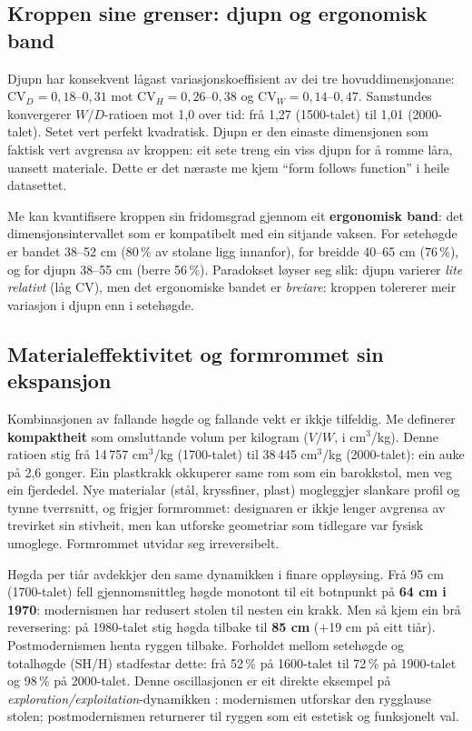 \documentclass[10pt, a4paper, twocolumn]{article}
\begin{document}
\subsection{Kroppen sine grenser: djupn og ergonomisk band}

Djupn har konsekvent lågast variasjonskoeffisient av dei tre hovuddimensjonane: $\text{CV}_D = 0{,}18$--$0{,}31$ mot $\text{CV}_H = 0{,}26$--$0{,}38$ og $\text{CV}_W = 0{,}14$--$0{,}47$. Samstundes konvergerer $W/D$-ratioen mot 1,0 over tid: frå 1,27 (1500-talet) til 1,01 (2000-talet). Setet vert perfekt kvadratisk. Djupn er den einaste dimensjonen som faktisk vert avgrensa av kroppen: eit sete treng ein viss djupn for å romme låra, uansett materiale. Dette er det næraste me kjem ``form follows function'' i heile datasettet.

Me kan kvantifisere kroppen sin fridomsgrad gjennom eit \textbf{ergonomisk band}: det dimensjonsintervallet som er kompatibelt med ein sitjande vaksen. For setehøgde er bandet 38--52 cm (80\,\% av stolane ligg innanfor), for breidde 40--65 cm (76\,\%), og for djupn 38--55 cm (berre 56\,\%). Paradokset løyser seg slik: djupn varierer \emph{lite relativt} (låg CV), men det ergonomiske bandet er \emph{breiare}: kroppen tolererer meir variasjon i djupn enn i setehøgde.

\subsection{Materialeffektivitet og formrommet sin ekspansjon}

Kombinasjonen av fallande høgde og fallande vekt er ikkje tilfeldig. Me definerer \textbf{kompaktheit} som omsluttande volum per kilogram ($V/W$, i cm$^3$/kg). Denne ratioen stig frå 14\,757 cm$^3$/kg (1700-talet) til 38\,445 cm$^3$/kg (2000-talet): ein auke på 2,6 gonger. Ein plastkrakk okkuperer same rom som ein barokkstol, men veg ein fjerdedel. Nye materialar (stål, kryssfiner, plast) mogleggjer slankare profil og tynne tverrsnitt, og frigjer formrommet: designaren er ikkje lenger avgrensa av trevirket sin stivheit, men kan utforske geometriar som tidlegare var fysisk umoglege. Formrommet utvidar seg irreversibelt.

Høgda per tiår avdekkjer den same dynamikken i finare oppløysing. Frå 95 cm (1700-talet) fell gjennomsnittleg høgde monotont til eit botnpunkt på \textbf{64 cm i 1970}: modernismen har redusert stolen til nesten ein krakk. Men så kjem ein brå reversering: på 1980-talet stig høgda tilbake til \textbf{85 cm} (+19 cm på eitt tiår). Postmodernismen henta ryggen tilbake. Forholdet mellom setehøgde og totalhøgde (SH/H) stadfestar dette: frå 52\,\% på 1600-talet til 72\,\% på 1900-talet og 98\,\% på 2000-talet. Denne oscillasjonen er eit direkte eksempel på \emph{exploration/exploitation}-dynamikken \citep{sutton2018}: modernismen utforskar den rygglause stolen; postmodernismen returnerer til ryggen som eit estetisk og funksjonelt val.
\end{document}
